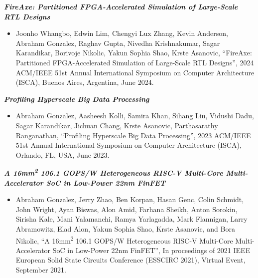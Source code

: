 \documentclass[letter]{res}
\begin{document}
\begin{resume}
{\sl \textbf{FireAxe: Partitioned FPGA-Accelerated Simulation of Large-Scale RTL Designs}}\\

 \vspace{-4mm}

\begin{itemize}
 \item Joonho Whangbo, Edwin Lim, Chengyi Lux Zhang, Kevin Anderson, Abraham Gonzalez, Raghav Gupta, Nivedha Krishnakumar, Sagar Karandikar, Borivoje Nikolic, Yakun Sophia Shao, Krste Asanovic, ``FireAxe: Partitioned FPGA-Accelerated Simulation of Large-Scale RTL Designs'', 2024 ACM/IEEE 51st Annual International Symposium on Computer Architecture (ISCA), Buenos Aires, Argentina, June 2024.
\end{itemize}

\vspace{-2mm}

{\sl \textbf{Profiling Hyperscale Big Data Processing}}\\

 \vspace{-4mm}

\begin{itemize}
 \item Abraham Gonzalez, Aasheesh Kolli, Samira Khan, Sihang Liu, Vidushi Dadu, Sagar Karandikar, Jichuan Chang, Krste Asanovic, Parthasarathy Ranganathan, ``Profiling Hyperscale Big Data Processing'', 2023 ACM/IEEE 51st Annual International Symposium on Computer Architecture (ISCA), Orlando, FL, USA, June 2023.
\end{itemize}

\vspace{-2mm}

{\sl \textbf{A 16mm\textsuperscript{2} 106.1 GOPS/W Heterogeneous RISC-V Multi-Core Multi-Accelerator SoC in Low-Power 22nm FinFET}}\\

 \vspace{-4mm}

\begin{itemize}
 \item Abraham Gonzalez, Jerry Zhao, Ben Korpan, Hasan Genc, Colin Schmidt, John Wright, Ayan Biswas, Alon Amid, Farhana Sheikh, Anton Sorokin, Sirisha Kale, Mani Yalamanchi, Ramya Yarlagadda, Mark Flannigan, Larry Abramowitz, Elad Alon, Yakun Sophia Shao, Krste Asanovic, and Bora Nikolic, ``A 16mm\textsuperscript{2} 106.1 GOPS/W Heterogeneous RISC-V Multi-Core Multi-Accelerator SoC in Low-Power 22nm FinFET'', In proceedings of 2021 IEEE European Solid State Circuits Conference (ESSCIRC 2021), Virtual Event, September 2021.
\end{itemize}


\end{resume}
\end{document}
